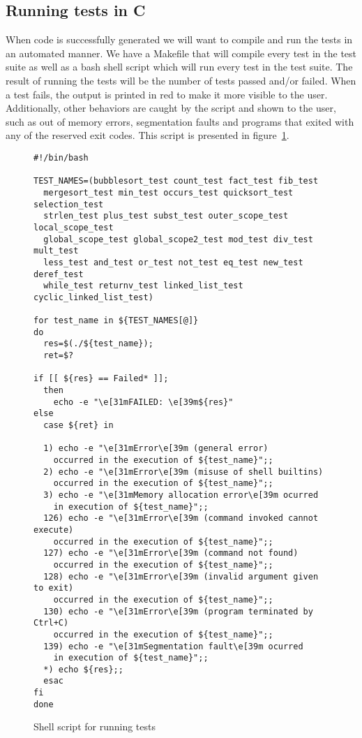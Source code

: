 \subsection{Running tests in C}

When code is successfully generated we will want to compile and run the tests in an automated manner.
We have a Makefile that will compile every test in the test suite as well as a bash shell script which will run every test in the test suite.
The result of running the tests will be the number of tests passed and/or failed.
When a test fails, the output is printed in red to make it more visible to the user.
Additionally, other behaviors are caught by the script and shown to the user, such as out of memory errors, segmentation faults and programs that exited with any of the reserved exit codes\cite{bash-scripting}.
This script is presented in figure~\ref{fig:bash_script}.

\begin{figure}
\begin{lstlisting}
#!/bin/bash

TEST_NAMES=(bubblesort_test count_test fact_test fib_test
  mergesort_test min_test occurs_test quicksort_test selection_test
  strlen_test plus_test subst_test outer_scope_test local_scope_test
  global_scope_test global_scope2_test mod_test div_test mult_test
  less_test and_test or_test not_test eq_test new_test deref_test
  while_test returnv_test linked_list_test cyclic_linked_list_test)

for test_name in ${TEST_NAMES[@]}
do
  res=$(./${test_name});
  ret=$?

if [[ ${res} == Failed* ]];
  then
    echo -e "\e[31mFAILED: \e[39m${res}"
else
  case ${ret} in

  1) echo -e "\e[31mError\e[39m (general error)
    occurred in the execution of ${test_name}";;
  2) echo -e "\e[31mError\e[39m (misuse of shell builtins)
    occurred in the execution of ${test_name}";;
  3) echo -e "\e[31mMemory allocation error\e[39m ocurred
    in execution of ${test_name}";;
  126) echo -e "\e[31mError\e[39m (command invoked cannot execute)
    occurred in the execution of ${test_name}";;
  127) echo -e "\e[31mError\e[39m (command not found)
    occurred in the execution of ${test_name}";;
  128) echo -e "\e[31mError\e[39m (invalid argument given to exit)
    occurred in the execution of ${test_name}";;
  130) echo -e "\e[31mError\e[39m (program terminated by Ctrl+C)
    occurred in the execution of ${test_name}";;
  139) echo -e "\e[31mSegmentation fault\e[39m ocurred
    in execution of ${test_name}";;
  *) echo ${res};;
  esac
fi
done
\end{lstlisting}

\caption{Shell script for running tests}
\label{fig:bash_script}
\end{figure}

